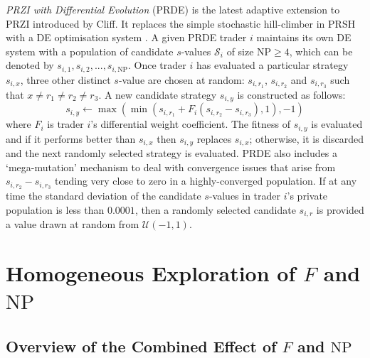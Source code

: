 \documentclass[conference]{IEEEtran}
\begin{document}
\textit{PRZI with Differential Evolution} (PRDE) \cite{PRDE} is the latest adaptive extension to PRZI introduced by Cliff.
It replaces the simple stochastic hill-climber in PRSH with a DE optimisation system \cite{StornPrice}.
A given PRDE trader $i$ maintains its own DE system with a population of candidate $s$-values $\mathcal{S}_i$ of size $\mathrm{NP}\ge4$, which can be denoted by $s_{i,1},s_{i,2},...,s_{i,\mathrm{NP}}$.
Once trader $i$ has evaluated a particular strategy $s_{i,x}$, three other distinct $s$-value are chosen at random: $s_{i,r_1}$, $s_{i,r_2}$ and $s_{i,r_3}$ such that $x\ne r_1\ne r_2\ne r_3$.
A new candidate strategy $s_{i,y}$ is constructed as follows:
\[
s_{i,y}\leftarrow\max(\min(s_{i,r_1}+F_i(s_{i,r_2}-s_{i,r_3}),1), -1)
\]
where $F_i$ is trader $i$'s differential weight coefficient.
The fitness of $s_{i,y}$ is evaluated and if it performs better than $s_{i,x}$ then $s_{i,y}$ replaces $s_{i,x}$; otherwise, it is discarded and the next randomly selected strategy is evaluated.
PRDE also includes a `mega-mutation' mechanism to deal with convergence issues that arise from $s_{i,r_2}-s_{i,r_3}$ tending very close to zero in a highly-converged population.
If at any time the standard deviation of the candidate $s$-values in trader $i$'s private population is less than $0.0001$, then a randomly selected candidate $s_{i,r}$ is provided a value drawn at random from $\mathcal{U}(-1,1)$.

\section{Homogeneous Exploration of $F$ and $\mathrm{NP}$}

\subsection{Overview of the Combined Effect of $F$ and $\mathrm{NP}$}
\end{document}
